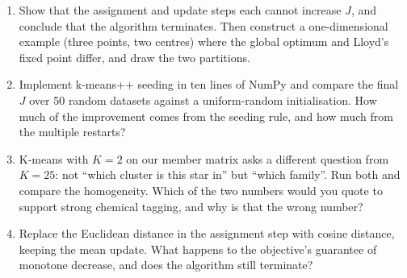 \begin{issues}[EXERCISES]
\begin{enumerate}
\item Show that the assignment and update steps each cannot increase $J$, and
  conclude that the algorithm terminates. Then construct a one-dimensional
  example (three points, two centres) where the global optimum and Lloyd's
  fixed point differ, and draw the two partitions.
\item Implement k-means++ seeding in ten lines of NumPy and compare the final
  $J$ over 50 random datasets against a uniform-random initialisation. How
  much of the improvement comes from the seeding rule, and how much from the
  multiple restarts?
\item K-means with $K=2$ on our member matrix asks a different question from
  $K=25$: not ``which cluster is this star in'' but ``which family''. Run
  both and compare the homogeneity. Which of the two numbers would you quote
  to support strong chemical tagging, and why is that the wrong number?
\item Replace the Euclidean distance in the assignment step with cosine
  distance, keeping the mean update. What happens to the objective's
  guarantee of monotone decrease, and does the algorithm still terminate?
\end{enumerate}
\end{issues}
